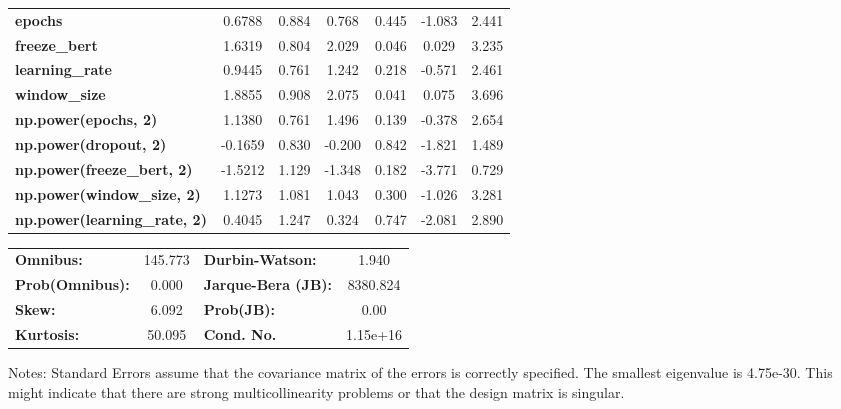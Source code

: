 \begin{center}
\begin{tabular}{lcccccc}
\textbf{epochs}                            &       0.6788  &        0.884     &     0.768  &         0.445        &       -1.083    &        2.441     \\
\textbf{freeze\_bert}                      &       1.6319  &        0.804     &     2.029  &         0.046        &        0.029    &        3.235     \\
\textbf{learning\_rate}                    &       0.9445  &        0.761     &     1.242  &         0.218        &       -0.571    &        2.461     \\
\textbf{window\_size}                      &       1.8855  &        0.908     &     2.075  &         0.041        &        0.075    &        3.696     \\
\textbf{np.power(epochs, 2)}               &       1.1380  &        0.761     &     1.496  &         0.139        &       -0.378    &        2.654     \\
\textbf{np.power(dropout, 2)}              &      -0.1659  &        0.830     &    -0.200  &         0.842        &       -1.821    &        1.489     \\
\textbf{np.power(freeze\_bert, 2)}         &      -1.5212  &        1.129     &    -1.348  &         0.182        &       -3.771    &        0.729     \\
\textbf{np.power(window\_size, 2)}         &       1.1273  &        1.081     &     1.043  &         0.300        &       -1.026    &        3.281     \\
\textbf{np.power(learning\_rate, 2)}       &       0.4045  &        1.247     &     0.324  &         0.747        &       -2.081    &        2.890     \\
\bottomrule
\end{tabular}
\begin{tabular}{lclc}
\textbf{Omnibus:}       & 145.773 & \textbf{  Durbin-Watson:     } &    1.940  \\
\textbf{Prob(Omnibus):} &   0.000 & \textbf{  Jarque-Bera (JB):  } & 8380.824  \\
\textbf{Skew:}          &   6.092 & \textbf{  Prob(JB):          } &     0.00  \\
\textbf{Kurtosis:}      &  50.095 & \textbf{  Cond. No.          } & 1.15e+16  \\
\bottomrule
\end{tabular}
\end{center}

Notes: \newline
 [1] Standard Errors assume that the covariance matrix of the errors is correctly specified. \newline
 [2] The smallest eigenvalue is 4.75e-30. This might indicate that there are \newline
 strong multicollinearity problems or that the design matrix is singular.